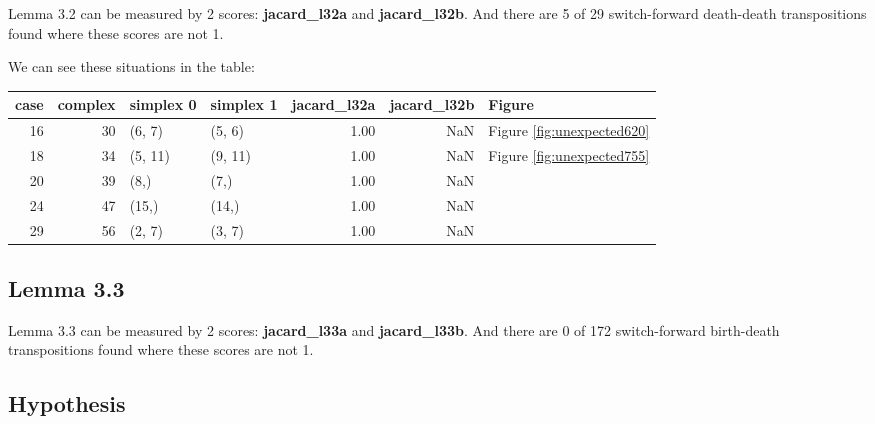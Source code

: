 \documentclass{article}
\begin{document}
\par Lemma 3.2 can be measured by 2 scores: \textbf{jacard\_l32a} and \textbf{jacard\_l32b}.
And there are 5 of 29 switch-forward death-death transpositions found where these scores are not 1.
\par We can see these situations in the table:
\begin{center}\begin{tabular}{rrllrrl}
\toprule
case & complex & simplex 0 & simplex 1 & jacard\_l32a & jacard\_l32b & Figure \\
\midrule
16 & 30 & (6, 7) & (5, 6) & 1.00 & NaN & Figure \ref{fig:unexpected620} \\
18 & 34 & (5, 11) & (9, 11) & 1.00 & NaN & Figure \ref{fig:unexpected755} \\
20 & 39 & (8,) & (7,) & 1.00 & NaN &  \\
24 & 47 & (15,) & (14,) & 1.00 & NaN &  \\
29 & 56 & (2, 7) & (3, 7) & 1.00 & NaN &  \\
\bottomrule
\end{tabular}
\end{center}
\subsection{Lemma 3.3}

\par Lemma 3.3 can be measured by 2 scores: \textbf{jacard\_l33a} and \textbf{jacard\_l33b}.
And there are 0 of 172 switch-forward birth-death transpositions found where these scores are not 1.

\subsection{Hypothesis}
\end{document}
